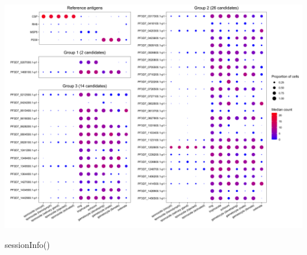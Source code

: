 \documentclass[
  11pt,
  oneside]{book}
\newenvironment{Shaded}{\begin{snugshade}}{\end{snugshade}}
\newcommand{\FunctionTok}[1]{\textcolor[rgb]{0.00,0.00,0.00}{#1}}
\newcommand{\NormalTok}[1]{#1}
\begin{document}
\begin{center}\includegraphics[width=1\linewidth]{./figures/Supplementary Fig 11} \end{center}

\begin{Shaded}
\begin{Highlighting}[]
\FunctionTok{sessionInfo}\NormalTok{()}
\end{Highlighting}
\end{Shaded}
\end{document}
